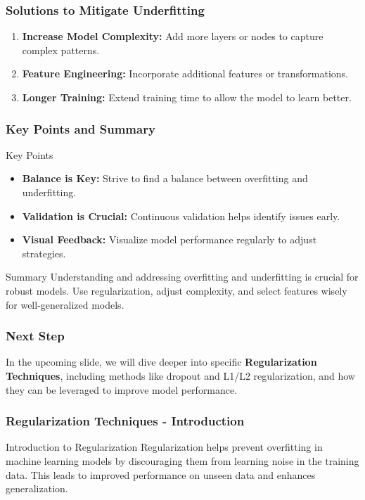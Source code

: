 \documentclass[aspectratio=169]{beamer}
\begin{document}
\begin{frame}[fragile]
    \frametitle{Solutions to Mitigate Underfitting}
    \begin{enumerate}
        \item \textbf{Increase Model Complexity:} Add more layers or nodes to capture complex patterns.
        \item \textbf{Feature Engineering:} Incorporate additional features or transformations.
        \item \textbf{Longer Training:} Extend training time to allow the model to learn better.
    \end{enumerate}
\end{frame}

\begin{frame}[fragile]
    \frametitle{Key Points and Summary}
    \begin{block}{Key Points}
        \begin{itemize}
            \item \textbf{Balance is Key:} Strive to find a balance between overfitting and underfitting.
            \item \textbf{Validation is Crucial:} Continuous validation helps identify issues early.
            \item \textbf{Visual Feedback:} Visualize model performance regularly to adjust strategies.
        \end{itemize}
    \end{block}
    \begin{block}{Summary}
        Understanding and addressing overfitting and underfitting is crucial for robust models. Use regularization, adjust complexity, and select features wisely for well-generalized models.
    \end{block}
\end{frame}

\begin{frame}[fragile]
    \frametitle{Next Step}
    In the upcoming slide, we will dive deeper into specific \textbf{Regularization Techniques}, including methods like dropout and L1/L2 regularization, and how they can be leveraged to improve model performance.
\end{frame}

\begin{frame}[fragile]
    \frametitle{Regularization Techniques - Introduction}
    \begin{block}{Introduction to Regularization}
        Regularization helps prevent overfitting in machine learning models by discouraging them from learning noise in the training data. 
        This leads to improved performance on unseen data and enhances generalization.
    \end{block}
\end{frame}
\end{document}

